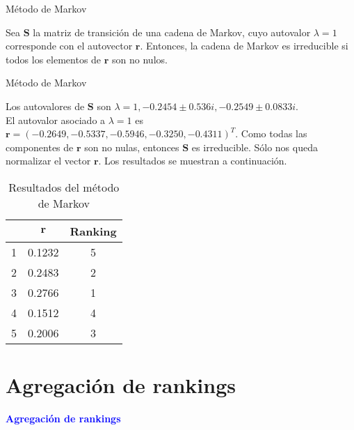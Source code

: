 \documentclass[10pt,hyperref={unicode}]{beamer}
\begin{document}
	\begin{frame}{Método de Markov}
	\begin{prop}
		Sea $\mathbf{S}$ la matriz de transición de una cadena de Markov, cuyo autovalor $\lambda = 1$ corresponde con el autovector $\mathbf{r}$. Entonces, la cadena de Markov es irreducible si todos los elementos de $\mathbf{r}$ son no nulos.
	\end{prop}
	\end{frame}
	
	\begin{frame}{Método de Markov}
		\begin{ejemplo}[continuación]
		Los autovalores de $\mathbf{S}$ son $\lambda = 1, -0.2454 \pm 0.536i, -0.2549 \pm 0.0833i$.\\
		El autovalor asociado a $\lambda = 1$ es $\mathbf{r} = (-0.2649, -0.5337, -0.5946, -0.3250, -0.4311)^T$. Como todas las componentes de $\mathbf{r}$ son no nulas, entonces $\mathbf{S}$ es irreducible. Sólo nos queda normalizar el vector $\mathbf{r}$. Los resultados se muestran a continuación. 
		
		\begin{table}[h]
			\centering
			\caption{Resultados del método de Markov}
			\label{tbl:markov_resultados}
			\begin{tabular}{@{}ccc@{}}
				\cmidrule(l){2-3}
				& $\mathbf{r}$ & Ranking \\ \midrule
				1 & 0.1232       & 5       \\
				2 & 0.2483       & 2       \\
				3 & 0.2766       & 1       \\
				4 & 0.1512       & 4       \\
				5 & 0.2006       & 3       \\ \bottomrule
			\end{tabular}
		\end{table}
		\end{ejemplo}
	\end{frame}
	
	\section{Agregación de rankings}
	
	\begin{frame}
		\begin{center}
			\Huge\textbf{\textsf{\textcolor{blue}{Agregación de rankings}}}
		\end{center}
	\end{frame}
	
\end{document}
